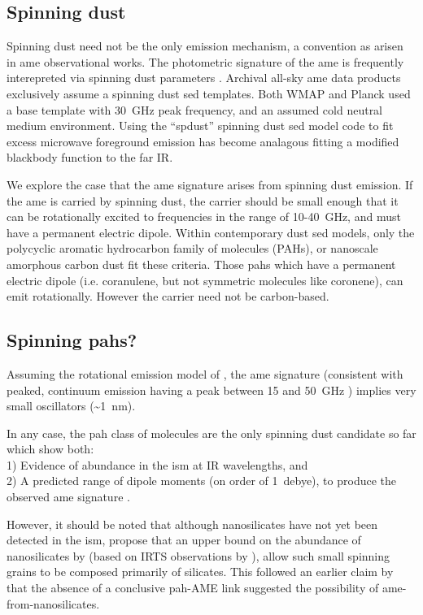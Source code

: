     \subsection{Spinning dust}
     Spinning dust need not be the only emission mechanism, a convention as arisen in \acrshort{ame} observational works. The photometric signature of the \acrshort{ame} is frequently interepreted via spinning dust parameters \citep{ysard11,ali-haimoud10}. Archival all-sky \acrshort{ame} data products exclusively assume a spinning dust \acrshort{sed} templates. Both WMAP and Planck used a base template with 30~GHz peak frequency, and an assumed cold neutral medium environment. Using the ``spdust'' spinning dust \acrshort{sed} model code to fit excess microwave foreground emission has become analagous fitting a modified blackbody function to the far IR.

      We explore the case that the \acrshort{ame} signature arises from spinning dust emission. If the \acrshort{ame} is carried by spinning dust, the carrier should be small enough that it can be rotationally excited to frequencies in the range of 10-40~GHz, and must have a permanent electric dipole. Within contemporary dust \acrshort{sed} models, only the polycyclic aromatic hydrocarbon family of molecules (PAHs), or nanoscale amorphous carbon dust fit these criteria. Those \acrshort{pah}s which have a permanent electric dipole (i.e. coranulene, but not symmetric molecules like coronene), can emit rotationally. However the carrier need not be carbon-based.

     \subsection{Spinning \acrshort{pah}s?}
       Assuming the rotational emission model of \cite{draine98b}, the \acrshort{ame} signature (consistent with peaked, continuum emission having a peak between 15 and 50~GHz ) implies very small oscillators (\textasciitilde{}1~nm).

       In any case, the \acrshort{pah} class of molecules are the only spinning dust candidate so far which show both: \\
       1) Evidence of abundance in the \acrshort{ism} at IR wavelengths, and \\
       2) A predicted range of dipole moments (on order of 1~debye), to produce the observed \acrshort{ame} signature \citep{draine98b, lovas05, thorwirth07}.

       However, it should be noted that although nanosilicates have not yet been detected in the \acrshort{ism}, \cite{hensley17a} propose that an upper bound on the abundance of nanosilicates by \cite{li01} (based on IRTS observations by \cite{onaka96}), allow such small spinning grains to be composed primarily of silicates. This followed an earlier claim by \cite{hensley16} that the absence of a conclusive \acrshort{pah}-AME link suggested the possibility of \acrshort{ame}-from-nanosilicates.

